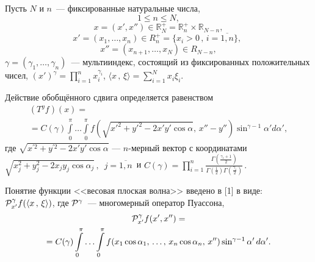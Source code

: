 


\vzmscaption

Пусть $N$ и $n$~--- фиксированные натуральные числа,
$$1\leqslant n\leqslant N,$$
$$x=(x',x'')\in \mathbb{R}_N^+=\mathbb{R}_n^+\times\mathbb{R}_{N-n},$$
$$
x'=(x_1,\ldots,x_n)\in R_n^+=\{x_i>0\,,\, i=\overline{1,n}\},\,\,
$$
$$
x''=(x_{n+1},\ldots,x_N)\in R_{N-n},
$$
$\gamma=(\gamma_1,\ldots,\gamma_n)$~--- мультииндекс, состоящий из
фиксированных положительных чисел, $(x')^\gamma=\prod_{i=1}^n x_i^{\gamma_i}$,
$\langle x\,,\,\xi\rangle{=}\sum_{i=1}^{N}x_i\xi_i$.

Действие обобщённого сдвига определяется  равенством
\begin{multline*}
(T^y f)(x)=
\\=
C(\gamma)\int\limits_{0}^{\pi}
\ldots \int\limits_{0}^{\pi}
f\left(\sqrt{x'^2{+}y'^2{-}2x'y'\cos\alpha},\,
 x''{-}y''\right)\sin^{\gamma-1}\alpha' d\alpha',
\end{multline*}
где $\sqrt{x^{'2}+y^{'2}-2x'y'\cos\alpha}$ --- $n$-мерный вектор  с координатами\\
$\sqrt{x_j^{2}+y_j^{2}-2x_jy_j\cos\alpha_j}\,,\,\,\, j=\overline{1,n}$\, и
$
C(\gamma)=\prod\limits_{i=1}^n\frac{\Gamma\left(\frac{\gamma_i+1}{2}\right)}
{\Gamma\left(\frac{1}{2}\right)\Gamma\left(\frac{\gamma_i}{2}\right)}\,.
$

Понятие функции <<весовая плоская волна>> введено в [1] в виде:
${\cal P}^\gamma_{x'} f(\langle x\,,\,\xi\rangle)$,
где ${\cal P}^\gamma$~--- многомерный оператор Пуассона,
\begin{multline*}
{\cal P}^\gamma_{x'} f(x',x'')=
\\=
C(\gamma)
\int\limits_0^\pi\ldots\int\limits_0^\pi f(x_1\cos\alpha_1,\,\ldots,\,x_n\cos\alpha_n,\,x'')
\sin^{\gamma-1}\alpha'\,d\alpha'.
\end{multline*}

